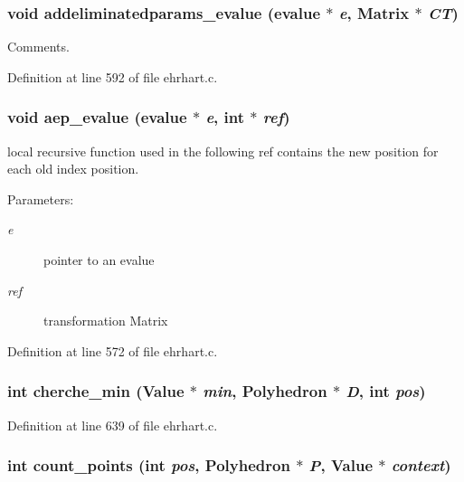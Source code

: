 \subsubsection{\setlength{\rightskip}{0pt plus 5cm}void addeliminatedparams\_\-evalue (evalue $\ast$ {\em e}, Matrix $\ast$ {\em CT})\hspace{0.3cm}{\tt  [static]}}\label{ehrhart_8c_a18}


Comments.



Definition at line 592 of file ehrhart.c.
\subsubsection{\setlength{\rightskip}{0pt plus 5cm}void aep\_\-evalue (evalue $\ast$ {\em e}, int $\ast$ {\em ref})\hspace{0.3cm}{\tt  [static]}}\label{ehrhart_8c_a17}


local recursive function used in the following ref contains the new position for each old index position.

\begin{Desc}
\item[Parameters: ]\par
\begin{description}
\item[{\em 
e}]pointer to an evalue \item[{\em 
ref}]transformation Matrix \end{description}
\end{Desc}


Definition at line 572 of file ehrhart.c.
\subsubsection{\setlength{\rightskip}{0pt plus 5cm}int cherche\_\-min (Value $\ast$ {\em min}, Polyhedron $\ast$ {\em D}, int {\em pos})}\label{ehrhart_8c_a19}




Definition at line 639 of file ehrhart.c.
\subsubsection{\setlength{\rightskip}{0pt plus 5cm}int count\_\-points (int {\em pos}, Polyhedron $\ast$ {\em P}, Value $\ast$ {\em context})}\label{ehrhart_8c_a23}


